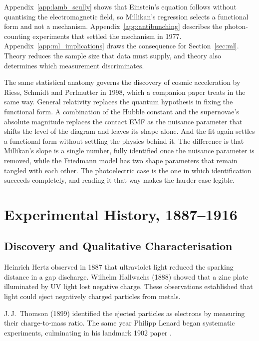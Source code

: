 \documentclass[12pt]{article}
\begin{document}
Appendix~\ref{app:lamb_scully} shows that Einstein's equation follows without
quantising the electromagnetic field, so Millikan's regression selects a
functional form and not a mechanism.
Appendix~\ref{app:antibunching} describes the photon-counting experiments that
settled the mechanism in 1977.
Appendix~\ref{app:ml_implications} draws the consequence for
Section~\ref{sec:ml}.  Theory reduces the sample size that data must supply,
and theory also determines which measurement discriminates.

The same statistical anatomy governs the discovery of cosmic acceleration by
Riess, Schmidt and Perlmutter in 1998, which a companion paper treats in the
same way.  General relativity replaces the quantum hypothesis in fixing the
functional form.  A combination of the Hubble constant and the supernovae's
absolute magnitude replaces the contact EMF as the nuisance parameter that
shifts the level of the diagram and leaves its shape alone.  And the fit again
settles a functional form without settling the physics behind it.  The
difference is that Millikan's slope is a single number, fully identified once
the nuisance parameter is removed, while the Friedmann model has two shape
parameters that remain tangled with each other.  The photoelectric case is the
one in which identification succeeds completely, and reading it that way makes
the harder case legible.

\section{Experimental History, 1887--1916}
\label{sec:history}

\subsection{Discovery and Qualitative Characterisation}

Heinrich Hertz observed in 1887 that ultraviolet light reduced the sparking
distance in a gap discharge.  Wilhelm Hallwachs (1888) showed that a zinc
plate illuminated by UV light lost negative charge.  These observations
established that light could eject negatively charged particles from metals.

J.\,J.\ Thomson (1899) identified the ejected particles as electrons by
measuring their charge-to-mass ratio.  The same year Philipp Lenard began
systematic experiments, culminating in his landmark 1902 paper
\citep{Lenard1902}.
\end{document}

